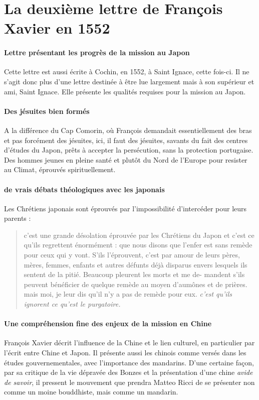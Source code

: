  
 \section{La deuxième lettre de François Xavier en 1552}
\paragraph{Lettre présentant les progrès de la mission au Japon} Cette lettre est aussi écrite à Cochin, en 1552, à Saint Ignace, cette fois-ci. Il ne s'agit donc plus d'une lettre destinée à être lue largement mais à son supérieur et ami, Saint Ignace. Elle présente les qualités requises pour la mission au Japon.

\paragraph{Des jésuites bien formés} A la différence du Cap Comorin, où François demandait essentiellement des bras et pas forcément des jésuites, ici, il faut des jésuites, savants du fait des centres d'études du Japon, prêts à accepter la persécution, sans la protection portugaise. Des hommes jeunes en pleine santé et plutôt du Nord de l'Europe pour resister au Climat, éprouvés spirituellement.

\paragraph{de vrais débats théologiques avec les japonais} Les Chrétiens japonais sont éprouvés par l'impossibilité d'intercéder pour leurs parents :
\begin{quote}
    c’est une grande désolation éprouvée par les Chrétiens du Japon et c’est ce qu’ils regrettent énormément : que nous disons que l’enfer est sans remède pour ceux qui y vont. S’ils l’éprouvent, c’est par amour de leurs pères, mères, femmes, enfants
et autres défunts déjà disparus envers lesquels ils
sentent de la pitié. Beaucoup pleurent les morts et me de-
mandent s’ils peuvent bénéficier de quelque remède
au moyen d’aumônes et de prières. mais moi, je leur
dis qu’il n’y a pas de remède pour eux. 
 \textit{c'est qu'ils ignorent ce qu'est le purgatoire.}
\end{quote}

\paragraph{Une compréhension fine des enjeux de la mission en Chine} François Xavier décrit l'influence de la Chine et le lien culturel, en particulier par l'écrit entre Chine et Japon. Il présente aussi les chinois comme versés dans les études gouvernementales, avec l'importance des mandarins. D'une certaine façon, par sa critique de la vie dépravée des Bonzes et la présentation d'une chine \textit{avide de savoir}, il pressent le mouvement que prendra Matteo Ricci de se présenter non comme un moine bouddhiste, mais comme un mandarin. 


